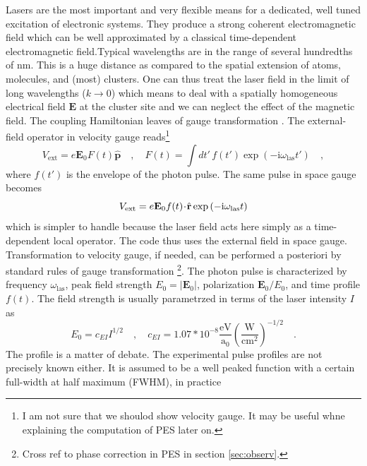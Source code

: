 \documentclass[final,1p]{elsarticle}
\newcommand{\PGRfoot}[1]{{\color{blue}\footnote{\color{blue} #1}}}
\begin{document}
Lasers are the most important and very flexible means for a dedicated,
well tuned excitation of electronic systems.  They produce a strong
coherent electromagnetic field which can be well approximated by a
classical time-dependent electromagnetic field.Typical wavelengths are
in the range of several hundredths of nm. This is a huge distance as
compared to the spatial extension of atoms, molecules, and (most)
clusters.  One can thus treat the laser field in the limit of long
wavelengths ($k \rightarrow 0$) which means to deal with a spatially
homogeneous electrical field $\mathbf{E}$ at the cluster site and we
can neglect the effect of the magnetic field.  The coupling
Hamiltonian leaves of gauge transformation \cite{Jac62}.
The external-field operator in velocity gauge reads\PGRfoot{I am not
  sure that we shoulod show velocity gauge. It may be useful whne
  explaining the computation of PES later on.}
\begin{equation}
  V_\mathrm{ext}
  =
  e\mathcal{\mathbf{E}}_0F(t)\hat{\mathbf{p}}
  \quad,\quad
  F(t)
  =
  \int dt'\,f(t')\exp{(-\mathrm{i}\omega_\mathrm{las}t')}
  \quad,
\label{eq:laserp}
\end{equation}
where $f(t')$ is the envelope of the photon pulse.
The same pulse in space gauge becomes
\begin{equation}
  V_\mathrm{ext}
  =
  e{\cal\bf E}_0f(t)\!\cdot\!\hat{\mathbf{r}}
  \exp{(-\mathrm{i}\omega_\mathrm{las}t)}
\label{eq:laserr}
\end{equation}
which is simpler to handle because the laser field acts here simply as
a time-dependent local operator. The code thus uses the external field
in space gauge. Transformation to velocity gauge, if needed, can
be performed a posteriori by standard rules of gauge transformation
\cite{Mes95aB}\PGRfoot{Cross ref to phase correction in PES in section
\ref{sec:observ}.}.
%
The photon pulse is characterized by frequency
$\omega_\mathrm{las}$, peak field strength $E_0=|\mathbf{E}_0|$,
polarization $\mathbf{E}_0/E_0$, and time profile $f(t)$. The
field strength is usually parametrzed in terms of the laser intensity
$I$ as
\begin{equation}
  E_0
  =
  c_{EI}
  I^{1/2}
  \quad,\quad
  c_{EI}
  =
  1.07*10^{-8}
  \frac{\mathrm{eV}}{\mathrm{a}_0}
  \left(\frac{\mathrm{W}}{\mathrm{cm}^2}\right)^{-1/2}
  \quad.
\end{equation}
The profile is a matter of debate.  The experimental pulse profiles
are not precisely known either.  It is assumed to be a well peaked
function with a certain full-width at half maximum (FWHM), in practice
\end{document}
